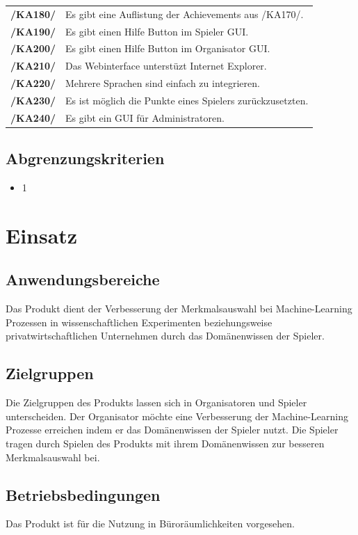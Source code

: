 \documentclass[a4paper]{scrreprt}
\begin{document}
\begin{tabularx}{\linewidth}{@{}>{\bfseries}l@{\hspace{.5em}}X@{}}
/KA180/ & Es gibt eine Auflistung der \Gls{Achievement}s aus /KA170/. \\
/KA190/ & Es gibt einen Hilfe Button im \Gls{Spieler} GUI. \\ %
/KA200/ & Es gibt einen Hilfe Button im \Gls{Organisator} GUI. \\ %
/KA210/ & Das Webinterface unterstüzt Internet Explorer. \\
/KA220/ & Mehrere Sprachen sind einfach zu integrieren. \\ 
/KA230/ & Es ist möglich die Punkte eines \Gls{Spieler}s zurückzusetzten. \\ %
/KA240/ & Es gibt ein GUI für \Gls{Administrator}en. \\ %
\end{tabularx}

\section{Abgrenzungskriterien}
\begin{itemize} 
  \item 1
\end{itemize} 
 
\chapter{Einsatz}

\section{Anwendungsbereiche}
Das \Gls{Produkt} dient der Verbesserung der Merkmalsauswahl bei Machine-Learning Prozessen in wissenschaftlichen
Experimenten beziehungsweise privatwirtschaftlichen Unternehmen durch das Domänenwissen der \Gls{Spieler}.

\section{Zielgruppen}
Die Zielgruppen des \Gls{Produkt}s lassen sich in \Gls{Organisator}en und \Gls{Spieler} unterscheiden.
Der Organisator möchte eine Verbesserung der Machine-Learning Prozesse erreichen indem er das Domänenwissen der Spieler nutzt.
Die Spieler tragen durch Spielen des \Gls{Produkt}s mit ihrem Domänenwissen zur besseren Merkmalsauswahl bei.

\section{Betriebsbedingungen}
Das \Gls{Produkt} ist für die Nutzung in Büroräumlichkeiten vorgesehen.
\end{document}
